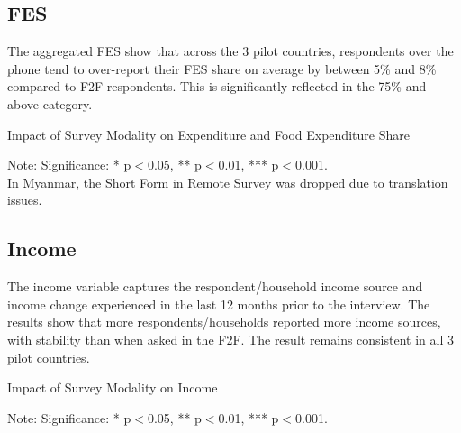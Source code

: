 \documentclass[11pt,harvard]{article}
\begin{document}
\pagebreak

\subsection{FES}

The aggregated FES show that across the 3 pilot countries, respondents over the phone tend to over-report their FES share on average by between 5\% and 8\% compared to F2F respondents. This is significantly reflected in the 75\% and above category.

\begin{table}[htbp]
	\centering
	\begin{adjustbox}{max width=\textwidth}
		\begin{threeparttable}
			\caption{Impact of Survey Modality on Expenditure and Food Expenditure Share}
			\scriptsize
			 
			\label{tab:FES_Modality_All_Country}
			\begin{tablenotes}
				\item Note: Significance: * p$<$0.05, ** p$<$0.01, *** p$<$0.001. \\ 
				In Myanmar, the Short Form in Remote Survey was dropped due to translation issues.
			\end{tablenotes}
		\end{threeparttable}
	\end{adjustbox}
\end{table}

\pagebreak

\subsection{Income}

The income variable captures the respondent/household income source and income change experienced in the last 12 months prior to the interview. The results show that more respondents/households reported more income sources, with stability than when asked in the F2F. The result remains consistent in all 3 pilot countries.   

\begin{table}[htbp]
	\centering
	\begin{adjustbox}{max width=\textwidth}
		\begin{threeparttable}
			\caption{Impact of Survey Modality on Income}
			\scriptsize
			 
			\label{tab:INC_Modality_All_Country}
			\begin{tablenotes}
				\item Note: Significance: * p$<$0.05, ** p$<$0.01, *** p$<$0.001. 
			\end{tablenotes}
		\end{threeparttable}
	\end{adjustbox}
\end{table}
\end{document}
